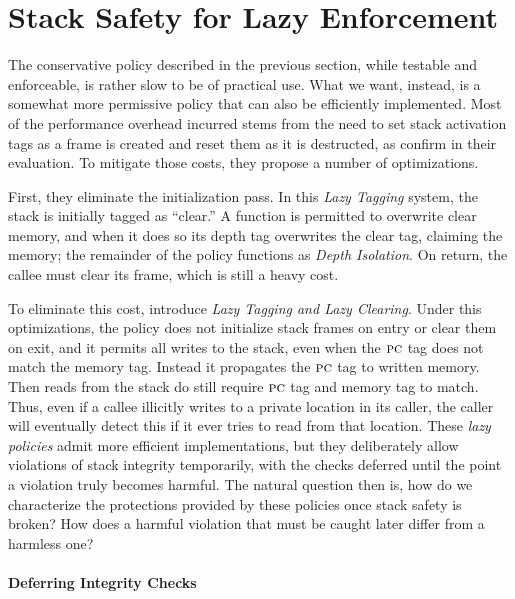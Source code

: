 \documentclass[acmsmall,review,anonymous]{acmart}\settopmatter{printfolios=true,printccs=false,printacmref=false}
\begin{document}
\section{Stack Safety for Lazy Enforcement}
\label{sec:lazy}

The conservative policy described in the previous section, while
testable and enforceable, is rather slow to be of practical use. What
we want, instead, is a somewhat more permissive policy that can also
be efficiently implemented. Most of the performance overhead incurred
stems from the need to set stack activation tags as a frame is created
and reset them as it is destructed, as
\citet{DBLP:conf/sp/RoesslerD18} confirm in their evaluation. To
mitigate those costs, they propose a number of optimizations.

First, they eliminate the initialization pass. In this {\em Lazy Tagging}
system, the stack is initially tagged as ``clear.''
A function is permitted
to overwrite clear memory, and when it does so its depth tag overwrites
the clear tag, claiming the memory; the remainder of the policy functions
as {\em Depth Isolation}. On return, the callee must clear its frame, which
is still a heavy cost.

To eliminate this cost, \citet{DBLP:conf/sp/RoesslerD18} introduce
{\em Lazy Tagging and Lazy Clearing}. Under this optimizations,
the policy does not initialize stack frames on entry or clear them on exit,
and it permits all writes to the stack, even when the $\textsc{pc}$ tag
does not match the memory tag. Instead it propagates the \(\textsc{pc}\) tag
to written memory. Then reads from the stack do still require $\textsc{pc}$
tag and memory tag to match. Thus, even if a callee illicitly writes to
a private location in its caller, the caller will eventually detect this
if it ever tries to read from that location.
%
These \emph{lazy policies} admit more efficient implementations, but
they deliberately allow violations of stack integrity temporarily,
with the checks deferred until the point a violation truly becomes
harmful. The natural question then is, how do we characterize the
protections provided by these policies once stack safety is broken?
How does a harmful violation that must be caught later differ from a
harmless one?

\paragraph*{Deferring Integrity Checks}
\end{document}
